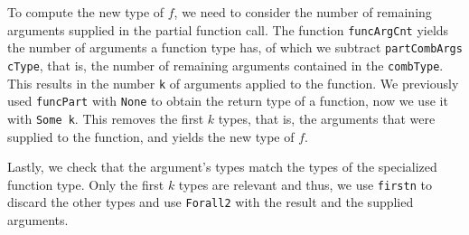 \documentclass[paper = a4, fleqn, abstract=on, twoside]{scrreprt}
\newcommand{\coqinline}[1]{\texttt{#1}}
\begin{document}
\par
To compute the new type of $f$, we need to consider the number of remaining arguments supplied in the partial function call. The function \coqinline{funcArgCnt} yields the number of arguments a function type has, of which we subtract \texttt{partCombArgs cType}, that is, the number of remaining arguments contained in the \texttt{combType}. This results in the number \texttt{k} of arguments applied to the function. We previously used \coqinline{funcPart} with \coqinline{None} to obtain the return type of a function, now we use it with \coqinline{Some k}. This removes the first $k$ types, that is, the arguments that were supplied to the function, and yields the new type of $f$.
\par
Lastly, we check that the argument's types match the types of the specialized function type. Only the first $k$ types are relevant and thus, we use \coqinline{firstn} to discard the other types and use \coqinline{Forall2} with the result and the supplied arguments.
\end{document}
